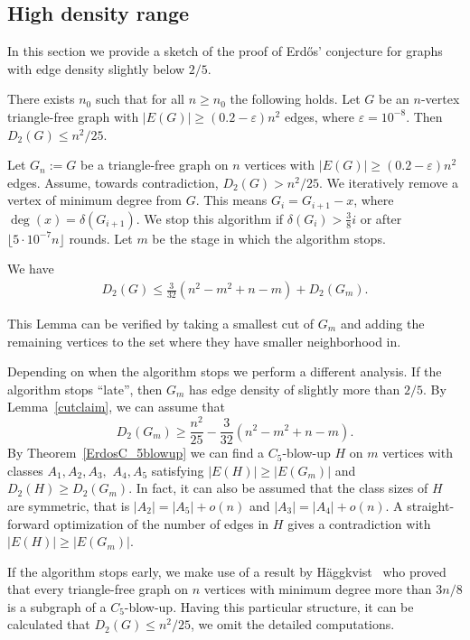 \documentclass{svproc}
\begin{document}
\subsection{High density range}
\label{slighlty below}

In this section we provide a sketch of the proof of Erd\H{o}s' conjecture for graphs with edge density slightly below $2/5$. 
\begin{theorem}
\label{theoslightlybelow}
There exists $n_0$ such that for all $n\geq n_0$ the following holds. Let $G$ be an $n$-vertex triangle-free graph with $ |E(G)|\geq (0.2-\varepsilon) n^2$ edges, where $\varepsilon=10^{-8}$. Then $D_2(G)\leq n^2/25$.  
\end{theorem}
Let $G_n:=G$ be a triangle-free graph on $n$ vertices with $|E(G)|\geq (0.2-\varepsilon) n^2$ edges. Assume, towards contradiction, $D_2(G)>n^2/25$. We iteratively remove a vertex of minimum degree from $G$. This means $G_i=G_{i+1}-x$, where $\deg(x)=\delta(G_{i+1})$. We stop this algorithm if $\delta(G_i)> \frac{3}{8}i$ or after $\lfloor 5 \cdot 10^{-7}n\rfloor$ rounds. Let $m$ be the stage in which the algorithm stops. 
\begin{lemma}
\label{cutclaim}
We have
\begin{align}
    D_2(G)\leq \frac{3}{32}(n^2-m^2+n-m) +D_2(G_m).
\end{align}
\end{lemma}
This Lemma can be verified by taking a smallest cut of $G_m$ and adding the remaining vertices to the set where they have smaller neighborhood in. 

Depending on when the algorithm stops we perform a different analysis. If the algorithm stops ``late'', then $G_m$ has edge density of slightly more than $2/5$.
By Lemma~\ref{cutclaim}, we can assume that 
\begin{equation}
    D_2(G_m) \geq \frac{n^2}{25}-\frac{3}{32}(n^2-m^2+n-m).
\end{equation}
By Theorem~\ref{ErdosC_5blowup} we can find a $C_5$-blow-up $H$ on $m$ vertices with classes $A_1,A_2,A_3,$ $A_4,A_5$ satisfying $|E(H)|\geq |E(G_m)|$ and $D_2(H)\geq D_2(G_m)$. In fact, it can also be assumed that the class sizes of $H$ are symmetric, that is $|A_2|=|A_5|+o(n)$ and $|A_3|=|A_4|+o(n)$. A straight-forward optimization of the number of edges in $H$ gives a contradiction with $|E(H)|\geq |E(G_m)|$.

If the algorithm stops early, we make use of a result by H{\"a}ggkvist~\cite{MR671908} who proved that every triangle-free graph on $n$ vertices with minimum degree more than $3n/8$ is a subgraph of a $C_5$-blow-up. Having this particular structure, it can be calculated that $D_2(G)\leq n^2/25$, we omit the detailed computations.
\end{document}

